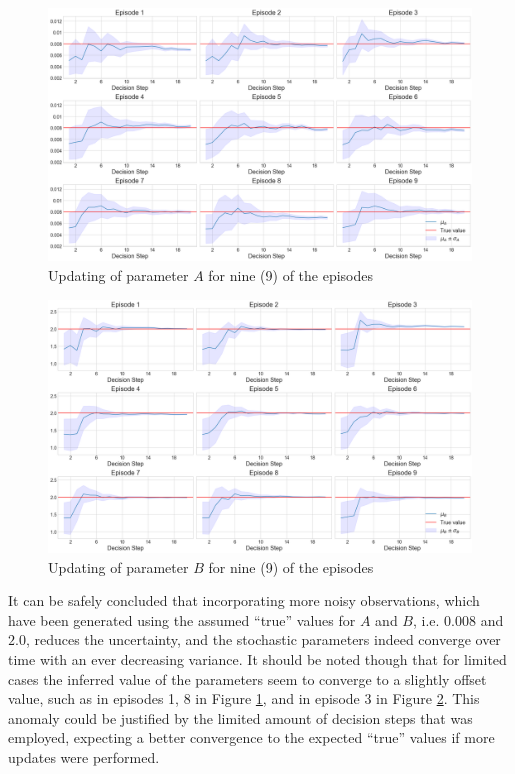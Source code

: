 \begin{figure}[H]
    \centering
	\includegraphics[width=\linewidth]{Figures/aInference.png}
	\caption{Updating of parameter $A$ for nine (9) of the episodes}
	\label{aUpdate}
\end{figure}

\begin{figure}[H]
    \centering
	\includegraphics[width=\linewidth]{Figures/bInference2.png}
	\caption{Updating of parameter $B$ for nine (9) of the episodes}
	\label{bUpdate}
\end{figure}

It can be safely concluded that incorporating more noisy observations, which have been generated using the assumed ``true'' values for $A$ and $B$, i.e. $0.008$ and $2.0$, reduces the uncertainty, and the stochastic parameters indeed converge over time with an ever decreasing variance. It should be noted though that for limited cases the inferred value of the parameters seem to converge to a slightly offset value, such as in episodes 1, 8 in Figure \ref{aUpdate}, and in episode 3 in Figure \ref{bUpdate}. This anomaly could be justified by the limited amount of decision steps that was employed, expecting a better convergence to the expected ``true'' values if more updates were performed.

